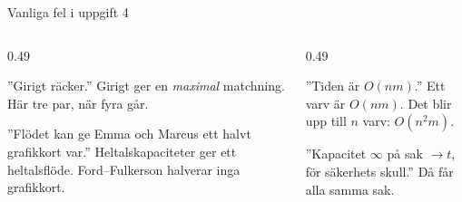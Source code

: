 \begin{frame}{Vanliga fel i uppgift 4}
\begin{columns}[T]
\begin{column}{0.49\textwidth}
\begin{missbox}[fontupper=\footnotesize]
”Girigt räcker.” Girigt ger en \emph{maximal} matchning. Här tre par, när fyra går.
\end{missbox}
\begin{missbox}[fontupper=\footnotesize]
”Flödet kan ge Emma och Marcus ett halvt grafikkort var.” Heltalskapaciteter ger ett
heltalsflöde. Ford--Fulkerson halverar inga grafikkort.
\end{missbox}
\end{column}
\begin{column}{0.49\textwidth}
\begin{missbox}[fontupper=\footnotesize]
”Tiden är $O(nm)$.” Ett varv är $O(nm)$. Det blir upp till $n$ varv: $O(n^2m)$.
\end{missbox}
\begin{missbox}[fontupper=\footnotesize]
”Kapacitet $\infty$ på sak $\to t$, för säkerhets skull.” Då får alla samma sak.
\end{missbox}
\end{column}
\end{columns}
\end{frame}
